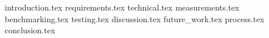 \documentclass[BSP,english,oneside]{ntnuthesis/ntnubachelorthesis}
\begin{document}


\makefrontpages 



\tableofcontents
\listoffigures
\listoftables


{introduction.tex}
{requirements.tex}
{technical.tex}
{measurements.tex}
{benchmarking.tex}
{testing.tex}
{discussion.tex}
{future_work.tex}
{process.tex}
{conclusion.tex}




\appendix %
%
%
%
%
\end{document}
